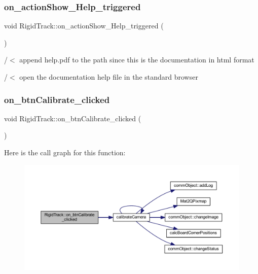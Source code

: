 \subsubsection{\texorpdfstring{on\+\_\+action\+Show\+\_\+\+Help\+\_\+triggered}{on\_actionShow\_Help\_triggered}}
{\footnotesize\ttfamily void Rigid\+Track\+::on\+\_\+action\+Show\+\_\+\+Help\+\_\+triggered (\begin{DoxyParamCaption}{ }\end{DoxyParamCaption})\hspace{0.3cm}{\ttfamily [slot]}}

/$<$ append help.\+pdf to the path since this is the documentation in html format

/$<$ open the documentation help file in the standard browser \mbox{\label{class_rigid_track_aed2c39da404909142074f7dd2ce75a63}} 
\subsubsection{\texorpdfstring{on\+\_\+btn\+Calibrate\+\_\+clicked}{on\_btnCalibrate\_clicked}}
{\footnotesize\ttfamily void Rigid\+Track\+::on\+\_\+btn\+Calibrate\+\_\+clicked (\begin{DoxyParamCaption}{ }\end{DoxyParamCaption})\hspace{0.3cm}{\ttfamily [slot]}}

Here is the call graph for this function\+:
\nopagebreak
\begin{figure}[H]
\begin{center}
\leavevmode
\includegraphics[width=350pt]{class_rigid_track_aed2c39da404909142074f7dd2ce75a63_cgraph}
\end{center}
\end{figure}
\mbox{\label{class_rigid_track_a9a939d6db3d268e75a603cb3d492a91b}} 
